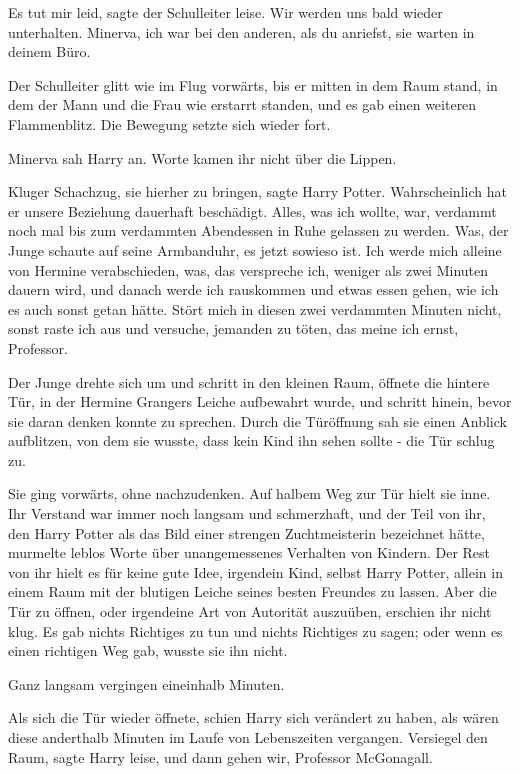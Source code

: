 \glqq Es tut mir leid\grqq{}, sagte der Schulleiter leise. \glqq Wir werden uns
bald wieder unterhalten. Minerva, ich war bei den anderen, als du anriefst, sie
warten in deinem Büro.\grqq{}

Der Schulleiter glitt wie im Flug vorwärts, bis er mitten in dem Raum stand, in
dem der Mann und die Frau wie erstarrt standen, und es gab einen weiteren
Flammenblitz. Die Bewegung setzte sich wieder fort.

Minerva sah Harry an. Worte kamen ihr nicht über die Lippen.

\glqq Kluger Schachzug, sie hierher zu bringen\grqq{}, sagte Harry Potter. \glqq
Wahrscheinlich hat er unsere Beziehung dauerhaft beschädigt. Alles, was ich
wollte, war, verdammt noch mal bis zum verdammten Abendessen in Ruhe gelassen zu
werden. Was\grqq{}, der Junge schaute auf seine Armbanduhr, \glqq es jetzt
sowieso ist. Ich werde mich alleine von Hermine verabschieden, was, das
verspreche ich, weniger als zwei Minuten dauern wird, und danach werde ich
rauskommen und etwas essen gehen, wie ich es auch sonst getan hätte. Stört mich
in diesen zwei verdammten Minuten nicht, sonst raste ich aus und versuche,
jemanden zu töten, das meine ich ernst, Professor.\grqq{}

Der Junge drehte sich um und schritt in den kleinen Raum, öffnete die hintere
Tür, in der Hermine Grangers Leiche aufbewahrt wurde, und schritt hinein, bevor
sie daran denken konnte zu sprechen. Durch die Türöffnung sah sie einen Anblick
aufblitzen, von dem sie wusste, dass kein Kind ihn sehen sollte - die Tür schlug
zu.

Sie ging vorwärts, ohne nachzudenken. Auf halbem Weg zur Tür hielt sie inne. Ihr
Verstand war immer noch langsam und schmerzhaft, und der Teil von ihr, den Harry
Potter als das Bild einer strengen Zuchtmeisterin bezeichnet hätte, murmelte
leblos Worte über unangemessenes Verhalten von Kindern. Der Rest von ihr hielt
es für keine gute Idee, irgendein Kind, selbst Harry Potter, allein in einem
Raum mit der blutigen Leiche seines besten Freundes zu lassen. Aber die Tür zu
öffnen, oder irgendeine Art von Autorität auszuüben, erschien ihr nicht klug. Es
gab nichts Richtiges zu tun und nichts Richtiges zu sagen; oder wenn es einen
richtigen Weg gab, wusste sie ihn nicht.

Ganz langsam vergingen eineinhalb Minuten.

Als sich die Tür wieder öffnete, schien Harry sich verändert zu haben, als wären
diese anderthalb Minuten im Laufe von Lebenszeiten vergangen. \glqq Versiegel
den Raum\grqq{}, sagte Harry leise, \glqq und dann gehen wir, Professor
McGonagall.\grqq{}

